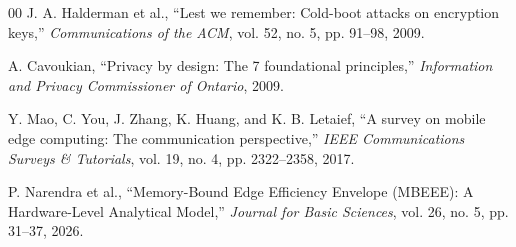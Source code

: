\documentclass[conference]{IEEEtran}
\begin{document}
\begin{thebibliography}{00}
 J. A. Halderman et al., ``Lest we remember: Cold-boot attacks on encryption keys,'' \textit{Communications of the ACM}, vol. 52, no. 5, pp. 91--98, 2009.

 A. Cavoukian, ``Privacy by design: The 7 foundational principles,'' \textit{Information and Privacy Commissioner of Ontario}, 2009.

 Y. Mao, C. You, J. Zhang, K. Huang, and K. B. Letaief, ``A survey on mobile edge computing: The communication perspective,'' \textit{IEEE Communications Surveys \& Tutorials}, vol. 19, no. 4, pp. 2322--2358, 2017.

 P. Narendra et al., ``Memory-Bound Edge Efficiency Envelope (MBEEE): A Hardware-Level Analytical Model,'' \textit{Journal for Basic Sciences}, vol. 26, no. 5, pp. 31--37, 2026.

\end{thebibliography}
\end{document}

